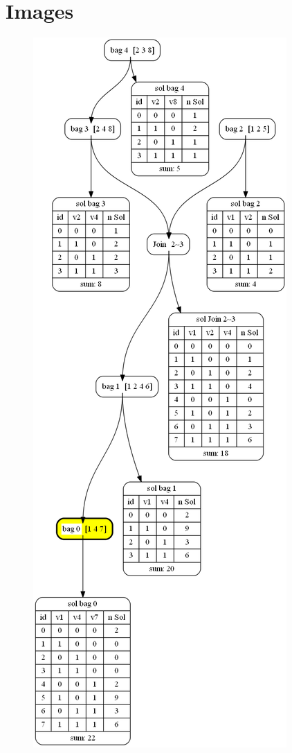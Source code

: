 \documentclass[a4paper, 12pt, bibliography=totoc]{scrartcl}
\begin{document}

\appendix
\singlespacing
\section{Images}
\begin{figure}[H]
	\centering
	\includegraphics[height=0.93\textheight]{images/g41digraphdot.png}

\end{figure}
\end{document}
